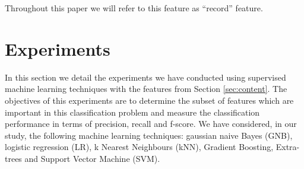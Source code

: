 Throughout this paper we will refer to this feature as ``record'' feature.





\section{Experiments}\label{sec:exp}


In this section we detail the experiments we have conducted using supervised
machine learning techniques with the features from Section \ref{sec:content}.
The objectives of this experiments are to determine the subset of features which
are important in this classification problem and measure the classification
performance in terms of precision, recall and f-score.
We have considered, in our study, the following machine learning techniques:
gaussian naive Bayes (GNB), logistic regression (LR), k Nearest Neighbours
(kNN), Gradient Boosting, Extra-trees and Support Vector Machine (SVM).

